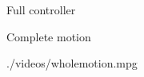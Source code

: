 
\begin{frame}{Full controller}
  \vspace*{1cm}
  \hspace*{-0.7cm}
  \scalebox{0.7}{} \\
%

%
\end{frame}

\begin{frame}{Complete motion}
\vspace*{0.6cm}
  \begin{center}
    {./videos/wholemotion.mpg}
  \end{center}
\end{frame}